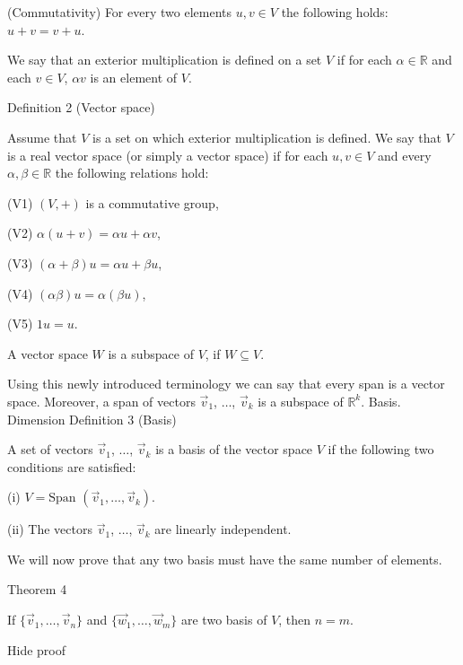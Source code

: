    (Commutativity) For every two elements \( u,v\in V \) the following holds: \( u+v=v+u \).

We say that an exterior multiplication is defined on a set \( V \) if for each \( \alpha\in \mathbb R \) and each \( v\in V \), \( \alpha v \) is an element of \( V \).

Definition 2 (Vector space)


Assume that \( V \) is a set on which exterior multiplication is defined. We say that \( V \) is a real vector space (or simply a vector space) if for each \( u,v\in V \) and every \( \alpha, \beta\in \mathbb R \) the following relations hold:

    (V1) \( (V,+) \) is a commutative group,

    (V2) \( \alpha(u+v)=\alpha u+\alpha v \),

    (V3) \( (\alpha+\beta)u=\alpha u+\beta u \),

    (V4) \( (\alpha\beta)u=\alpha (\beta u) \),

    (V5) \( 1u=u \).

A vector space \( W \) is a subspace of \( V \), if \( W\subseteq V \).

Using this newly introduced terminology we can say that every span is a vector space. Moreover, a span of vectors \( \overrightarrow v_1 \), \( \dots \), \( \overrightarrow v_k \) is a subspace of \( \mathbb R^k \).
Basis. Dimension
Definition 3 (Basis)


A set of vectors \( \overrightarrow v_1 \), \( \dots \), \( \overrightarrow v_k \) is a basis of the vector space \( V \) if the following two conditions are satisfied:

    (i) \(\displaystyle V=\mbox{Span }(\overrightarrow v_1, \dots, \overrightarrow v_k)\).

    (ii) The vectors \( \overrightarrow v_1 \), \( \dots \), \( \overrightarrow v_k \) are linearly independent.

We will now prove that any two basis must have the same number of elements.

Theorem 4

If \( \{\overrightarrow v_1, \dots, \overrightarrow v_n\} \) and \( \{\overrightarrow w_1, \dots, \overrightarrow w_m\} \) are two basis of \( V \), then \( n=m \).

Hide proof

